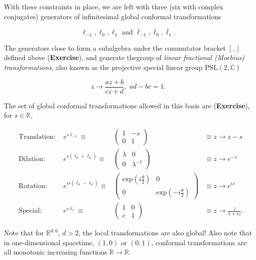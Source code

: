 \documentclass[10pt]{article}
\begin{document}
\noindent With these constraints in place, we are left with three (six with complex conjugates) generators of infinitesimal global conformal transformations

\begin{equation}
\ell_{-1}, \ell_0 , \ell_1 \text{ and } \bar{\ell}_{-1}, \bar{\ell}_0, \bar{\ell}_1.
\end{equation}

\noindent The generators close to form a subalgebra under the commutator bracket $[,]$ defined above (\textbf{Exercise}), and generate thegroup of \textit{linear fractional (Moebius) transformations}, also known as the projective special linear group $\text{PSL}(2,\mathbb{C})$

\begin{equation}
z \rightarrow \frac{az + b}{c z + d}, \,\, ad-bc = 1.
\end{equation}

\noindent The set of global conformal transformations allowed in this basis are (\textbf{Exercise}), for $s \in \mathbb{R}$,

\begin{align}
&\text{Translation: } &e^{s \ell_{-1}} \equiv &\begin{pmatrix}1&-s \\ 0&1 \end{pmatrix} &\equiv z \rightarrow z - s \\
&\text{Dilation: } &e^{s (\ell_0 + \bar{\ell}_0)} \equiv &\begin{pmatrix}\lambda&0 \\ 0&\lambda^{-1} \end{pmatrix} &\equiv z \rightarrow e^{-s} \\
&\text{Rotation: } &e^{is (\bar{\ell}_0 - \ell_0)} \equiv &\begin{pmatrix}\text{exp}(i\frac{\theta}{2})&0 \\ 0&\text{exp}(-i\frac{\theta}{2}) \end{pmatrix} &\equiv z \rightarrow e^{is} \\
&\text{Special: } &e^{s \ell_1} \equiv &\begin{pmatrix}1&0 \\ c&1 \end{pmatrix} &\equiv z \rightarrow \frac{z}{1+sz}.
\end{align}

\noindent Note that for $\mathbb{R}^{d,0}$, $d>2$, the local transformations are also global! Also note that in one-dimensional spacetime, $(1,0)$ or $(0,1)$, conformal transformations are all monotonic increasing functions $\mathbb{R} \rightarrow \mathbb{R}$.
\end{document}
